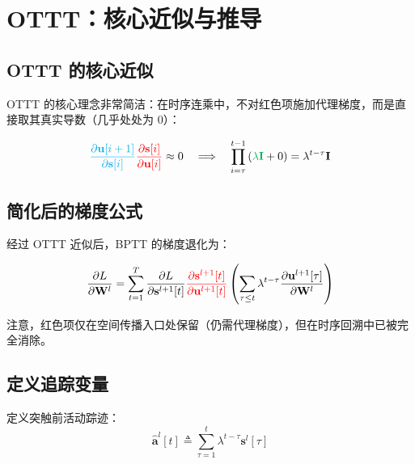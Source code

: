 \documentclass[journal,12pt,onecolumn]{IEEEtran}
\begin{document}
\section{OTTT：核心近似与推导}

\subsection*{OTTT 的核心近似}

OTTT 的核心理念非常简洁：在时序连乘中，不对红色项施加代理梯度，而是直接取其真实导数（几乎处处为 0）：

\begin{equation}
{\color{cyan}{\frac{\partial \mathbf{u}[i+1]}{\partial \mathbf{s}[i]}}}
{\color{red}{\frac{\partial \mathbf{s}[i]}{\partial \mathbf{u}[i]}}}
\approx 0
\quad\Longrightarrow\quad
\prod_{i=\tau}^{t-1}
\left({\color[rgb]{0,0.69,0.31}{\lambda \mathbf{I}}} + 0\right)
= \lambda^{t-\tau} \mathbf{I}
\label{eq.ottt_approx}
\end{equation}

\subsection*{简化后的梯度公式}

经过 OTTT 近似后，BPTT 的梯度退化为：

\begin{equation}
\frac{\partial L}{\partial \mathbf{W}^l}
=
\sum_{t=1}^T
\frac{\partial L}{\partial \mathbf{s}^{l+1}[t]}
{\color{red}{\frac{\partial \mathbf{s}^{l+1}[t]}{\partial \mathbf{u}^{l+1}[t]}}}
\left(
\sum_{\tau \leq t} \lambda^{t-\tau}
\frac{\partial \mathbf{u}^{l+1}[\tau]}{\partial \mathbf{W}^l}
\right)
\label{eq.ottt_gradient}
\end{equation}

注意，红色项仅在空间传播入口处保留（仍需代理梯度），但在时序回溯中已被完全消除。

\subsection*{定义追踪变量}

定义突触前活动踪迹：
\begin{equation}
\boxed{
\hat{\mathbf{a}}^{l}[t] \triangleq \sum_{\tau=1}^{t} \lambda^{t-\tau} \mathbf{s}^{l}[\tau]
}
\label{eq.trace}
\end{equation}
\end{document}
